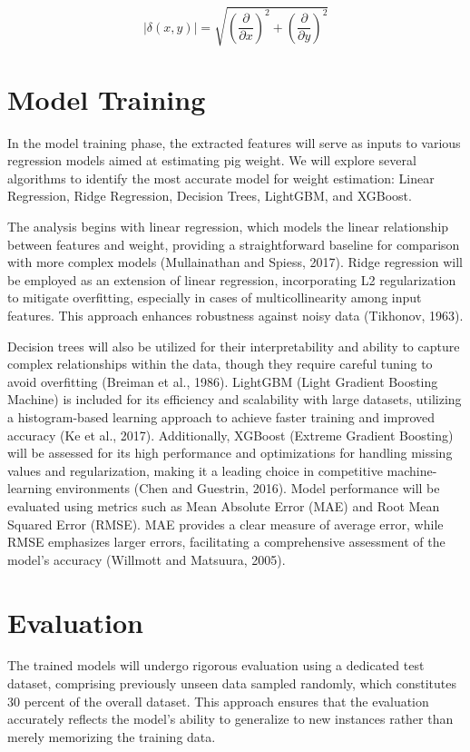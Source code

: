 {\begin{equation}
	\left| \delta(x,y) \right| = \sqrt{\left( \frac{\partial}{\partial x} \right)^2 + \left( \frac{\partial}{\partial y} \right)^2}
\end{equation}

\section{Model Training}
In the model training phase, the extracted features will serve as inputs to various regression models aimed at estimating pig weight. We will explore several algorithms to identify the most accurate model for weight estimation: Linear Regression, Ridge Regression, Decision Trees, LightGBM, and XGBoost.

The analysis begins with linear regression, which models the linear relationship between features and weight, providing a straightforward baseline for comparison with more complex models (Mullainathan and Spiess, 2017). Ridge regression will be employed as an extension of linear regression, incorporating L2 regularization to mitigate overfitting, especially in cases of multicollinearity among input features. This approach enhances robustness against noisy data (Tikhonov, 1963).

Decision trees will also be utilized for their interpretability and ability to capture complex relationships within the data, though they require careful tuning to avoid overfitting (Breiman et al., 1986). LightGBM (Light Gradient Boosting Machine) is included for its efficiency and scalability with large datasets, utilizing a histogram-based learning approach to achieve faster training and improved accuracy (Ke et al., 2017). Additionally, XGBoost (Extreme Gradient Boosting) will be assessed for its high performance and optimizations for handling missing values and regularization, making it a leading choice in competitive machine-learning environments (Chen and Guestrin, 2016).
Model performance will be evaluated using metrics such as Mean Absolute Error (MAE) and Root Mean Squared Error (RMSE). MAE provides a clear measure of average error, while RMSE emphasizes larger errors, facilitating a comprehensive assessment of the model's accuracy (Willmott and Matsuura, 2005).

\section{Evaluation}
The trained models will undergo rigorous evaluation using a dedicated test dataset, comprising previously unseen data sampled randomly, which constitutes 30 percent of the overall dataset. This approach ensures that the evaluation accurately reflects the model's ability to generalize to new instances rather than merely memorizing the training data.
}
